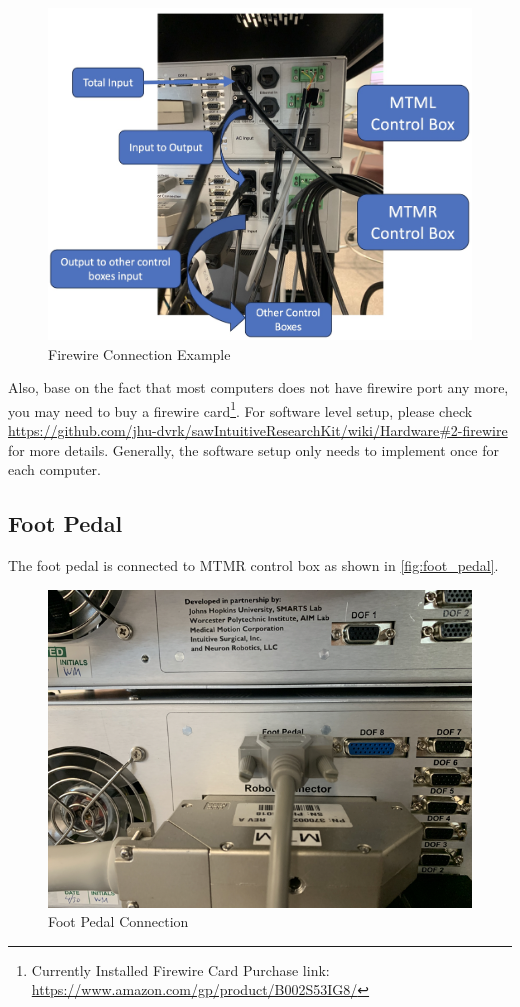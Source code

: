\begin{figure}[H]
    \centering 
    \includegraphics[width=0.9\linewidth]{figures/firewire_cable.jpg}
    \caption{Firewire Connection Example}
    \label{fig:firewire}
\end{figure}

Also, base on the fact that most computers does not have firewire port any more, you may need to buy a firewire card\footnote[1]{Currently Installed Firewire Card Purchase link: \url{https://www.amazon.com/gp/product/B002S53IG8/}}. For software level setup, please check \url{https://github.com/jhu-dvrk/sawIntuitiveResearchKit/wiki/Hardware#2-firewire} for more details. Generally, the software setup only needs to implement once for each computer.

\subsection{Foot Pedal}

The foot pedal is connected to MTMR control box as shown in \autoref{fig:foot_pedal}.

\begin{figure}[H]
    \centering 
    \includegraphics[width=0.7\linewidth]{figures/footpedal_port.png}
    \caption{Foot Pedal Connection}
    \label{fig:foot_pedal}
\end{figure}

